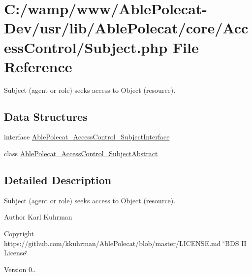 \hypertarget{_subject_8php}{}\section{C\+:/wamp/www/\+Able\+Polecat-\/\+Dev/usr/lib/\+Able\+Polecat/core/\+Access\+Control/\+Subject.php File Reference}
\label{_subject_8php}


\textquotesingle{}Subject\textquotesingle{} (agent or role) seeks access to \textquotesingle{}Object\textquotesingle{} (resource).  


\subsection*{Data Structures}
\begin{DoxyCompactItemize}
\item 
interface \hyperlink{interface_able_polecat___access_control___subject_interface}{Able\+Polecat\+\_\+\+Access\+Control\+\_\+\+Subject\+Interface}
\item 
class \hyperlink{class_able_polecat___access_control___subject_abstract}{Able\+Polecat\+\_\+\+Access\+Control\+\_\+\+Subject\+Abstract}
\end{DoxyCompactItemize}


\subsection{Detailed Description}
\textquotesingle{}Subject\textquotesingle{} (agent or role) seeks access to \textquotesingle{}Object\textquotesingle{} (resource). 

\begin{DoxyAuthor}{Author}
Karl Kuhrman 
\end{DoxyAuthor}
\begin{DoxyCopyright}{Copyright}
https\+://github.com/kkuhrman/\+Able\+Polecat/blob/master/\+L\+I\+C\+E\+N\+S\+E.\+md \char`\"{}\+B\+D\+S I\+I License\char`\"{} 
\end{DoxyCopyright}
\begin{DoxyVersion}{Version}
0.. 
\end{DoxyVersion}
